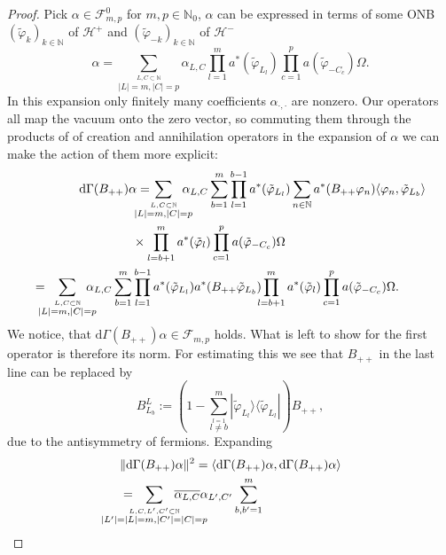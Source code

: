 \documentclass[b5paper,draft,openbib,12pt]{memoir}
\begin{document}
\begin{proof}
Pick \(\alpha\in\mathcal{F}^0_{m,p}\) for \(m,p\in\mathbb{N}_0\), \(\alpha\) can be expressed in terms of some ONB 
\((\tilde{\varphi}_k)_{k\in\mathbb{N}}\) of \(\mathcal{H}^+\) and \((\tilde{\varphi}_{-k})_{k\in\mathbb{N}}\) of \(\mathcal{H}^-\)
\begin{equation}
\alpha=\sum_{\overset{L,C\subset \mathbb{N}}{|L|=m,|C|=p}}\!\!\!\!\!\!\alpha_{L,C} \prod_{l=1}^m a^*(\tilde{\varphi}_{L_l}) \prod_{c=1}^p a(\tilde{\varphi}_{-C_c}) \Omega.
\end{equation}
In this expansion only finitely many coefficients \(\alpha_{\cdot, \cdot}\) are nonzero. Our operators all map the vacuum onto the zero vector, so commuting them 
through the products of of creation and annihilation operators in the expansion of \(\alpha\) we can make the action of them more explicit:
\begin{align}\nonumber
\mathrm{d}\Gamma(B_{++}) \alpha =\hspace{-0.5cm} &\sum_{\overset{L,C\subset \mathbb{N}}{|L|=m,|C|=p}}\!\!\!\!\!\!\alpha_{L,C} \sum_{b=1}^m 
\prod_{l=1}^{b-1} a^*(\tilde{\varphi}_{L_l})  \sum_{n\in\mathbb{N}} a^*(B_{++}\varphi_n) \langle \varphi_n, \tilde{\varphi}_{L_b}\rangle \\
&\times \prod_{l=b+1}^m a^*(\tilde{\varphi}_{l}) \prod_{c=1}^p a(\tilde{\varphi}_{-C_c}) \Omega\\
=\!\!\!\!\!\sum_{\overset{L,C\subset \mathbb{N}}{|L|=m,|C|=p}}\!\!\!\!\!\!\alpha_{L,C} \sum_{b=1}^m 
&\prod_{l=1}^{b-1} a^*(\tilde{\varphi}_{L_l})  a^*(B_{++} \tilde{\varphi}_{L_b})  \!\!\!
\prod_{l=b+1}^m a^*(\tilde{\varphi}_{l}) \prod_{c=1}^p a(\tilde{\varphi}_{-C_c}) \Omega.
\end{align}
We notice, that \(\mathrm{d}\Gamma(B_{++})\alpha \in \mathcal{F}_{m,p}\) holds. What is left to show for the first operator is therefore
its norm. For estimating this we see that \(B_{++}\) in the last line can be replaced by 
\begin{equation}
B^L_{L_b}:=\left(1-\sum_{\overset{l=1}{l\neq b}}^m |\tilde{\varphi}_{L_l}\rangle \langle \tilde{\varphi}_{L_l}|\right) B_{++},
\end{equation}
due to the antisymmetry of fermions. Expanding 
\begin{align}\nonumber
&\|\mathrm{d}\Gamma(B_{++})\alpha\|^2 = \langle \mathrm{d}\Gamma(B_{++})\alpha, \mathrm{d}\Gamma(B_{++})\alpha \rangle \\\nonumber
&= \hspace{-1cm}\sum_{\overset{L,C, L',C'\subset \mathbb{N}}{|L'|=|L|=m,|C'|=|C|=p}}\hspace{-1cm}\overline{\alpha_{L,C}}\alpha_{L',C'} \sum_{b,b'=1}^m 

\end{align}
\end{proof}
\end{document}
